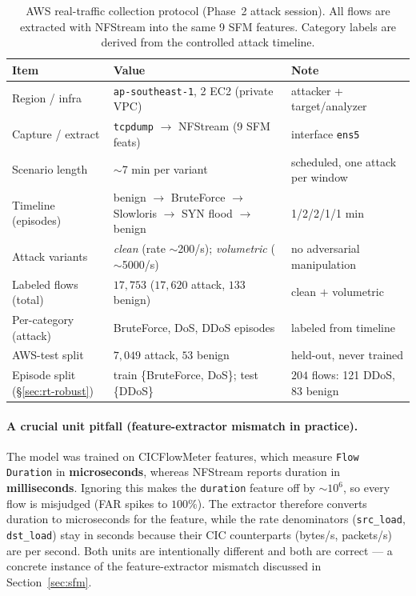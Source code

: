 \documentclass[preprint,12pt,authoryear]{elsarticle}
\begin{document}
\begin{table}[h]
\centering
\caption{AWS real-traffic collection protocol (Phase~2 attack session). All flows
are extracted with NFStream into the same 9 SFM features. Category labels are
derived from the controlled attack timeline.}
\label{tab:aws-protocol}
\small
\begin{tabular}{lll}
\toprule
Item & Value & Note \\
\midrule
Region / infra & \texttt{ap-southeast-1}, 2 EC2 (private VPC) & attacker + target/analyzer \\
Capture / extract & \texttt{tcpdump} $\to$ NFStream (9 SFM feats) & interface \texttt{ens5} \\
Scenario length & $\sim$7 min per variant & scheduled, one attack per window \\
Timeline (episodes) & benign $\to$ BruteForce $\to$ Slowloris $\to$ SYN flood $\to$ benign & 1/2/2/1/1 min \\
Attack variants & \emph{clean} (rate $\sim$200/s); \emph{volumetric} ($\sim$5000/s) & no adversarial manipulation \\
Labeled flows (total) & $17{,}753$ ($17{,}620$ attack, $133$ benign) & clean $+$ volumetric \\
Per-category (attack) & BruteForce, DoS, DDoS episodes & labeled from timeline \\
AWS-test split & $7{,}049$ attack, $53$ benign & held-out, never trained \\
Episode split (§\ref{sec:rt-robust}) & train \{BruteForce, DoS\}; test \{DDoS\} & $204$ flows: 121 DDoS, 83 benign \\
\bottomrule
\end{tabular}
\end{table}

\paragraph{A crucial unit pitfall (feature-extractor mismatch in practice).} The
model was trained on CICFlowMeter features, which measure \texttt{Flow Duration}
in \textbf{microseconds}, whereas NFStream reports duration in
\textbf{milliseconds}. Ignoring this makes the \texttt{duration} feature off by
$\sim$$10^6$, so every flow is misjudged (FAR spikes to $100\%$). The extractor
therefore converts duration to microseconds for the feature, while the rate
denominators (\texttt{src\_load}, \texttt{dst\_load}) stay in seconds because their
CIC counterparts (bytes/s, packets/s) are per second. Both units are intentionally
different and both are correct --- a concrete instance of the feature-extractor
mismatch discussed in Section~\ref{sec:sfm}.
\end{document}
